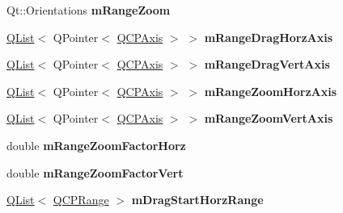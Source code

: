 \begin{DoxyCompactItemize}
\item 
Qt\+::\+Orientations {\bfseries m\+Range\+Zoom}\hypertarget{class_q_c_p_axis_rect_a215eff671d48df2edccc36e7f976f28c}{}\label{class_q_c_p_axis_rect_a215eff671d48df2edccc36e7f976f28c}

\item 
\hyperlink{class_q_list}{Q\+List}$<$ Q\+Pointer$<$ \hyperlink{class_q_c_p_axis}{Q\+C\+P\+Axis} $>$ $>$ {\bfseries m\+Range\+Drag\+Horz\+Axis}\hypertarget{class_q_c_p_axis_rect_a53c654a3f5c3d2cc933b1182844ddcea}{}\label{class_q_c_p_axis_rect_a53c654a3f5c3d2cc933b1182844ddcea}

\item 
\hyperlink{class_q_list}{Q\+List}$<$ Q\+Pointer$<$ \hyperlink{class_q_c_p_axis}{Q\+C\+P\+Axis} $>$ $>$ {\bfseries m\+Range\+Drag\+Vert\+Axis}\hypertarget{class_q_c_p_axis_rect_ad476bc1f62e85c194f8f156248b39903}{}\label{class_q_c_p_axis_rect_ad476bc1f62e85c194f8f156248b39903}

\item 
\hyperlink{class_q_list}{Q\+List}$<$ Q\+Pointer$<$ \hyperlink{class_q_c_p_axis}{Q\+C\+P\+Axis} $>$ $>$ {\bfseries m\+Range\+Zoom\+Horz\+Axis}\hypertarget{class_q_c_p_axis_rect_a3700988ec7ee02412de1fae4a75f7bf0}{}\label{class_q_c_p_axis_rect_a3700988ec7ee02412de1fae4a75f7bf0}

\item 
\hyperlink{class_q_list}{Q\+List}$<$ Q\+Pointer$<$ \hyperlink{class_q_c_p_axis}{Q\+C\+P\+Axis} $>$ $>$ {\bfseries m\+Range\+Zoom\+Vert\+Axis}\hypertarget{class_q_c_p_axis_rect_ab6b597596c4cbfdf9b90aefd59863fdf}{}\label{class_q_c_p_axis_rect_ab6b597596c4cbfdf9b90aefd59863fdf}

\item 
double {\bfseries m\+Range\+Zoom\+Factor\+Horz}\hypertarget{class_q_c_p_axis_rect_ad08d0250ed7b99de387d0ea6c7fd4dc1}{}\label{class_q_c_p_axis_rect_ad08d0250ed7b99de387d0ea6c7fd4dc1}

\item 
double {\bfseries m\+Range\+Zoom\+Factor\+Vert}\hypertarget{class_q_c_p_axis_rect_a32f063629581d5bf82b12769940b34ad}{}\label{class_q_c_p_axis_rect_a32f063629581d5bf82b12769940b34ad}

\item 
\hyperlink{class_q_list}{Q\+List}$<$ \hyperlink{class_q_c_p_range}{Q\+C\+P\+Range} $>$ {\bfseries m\+Drag\+Start\+Horz\+Range}\hypertarget{class_q_c_p_axis_rect_a6806a82287f962eeb35bbb7c02f56d1e}{}\label{class_q_c_p_axis_rect_a6806a82287f962eeb35bbb7c02f56d1e}


\end{DoxyCompactItemize}
